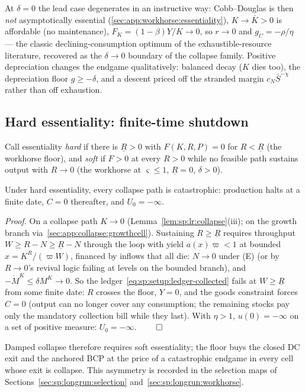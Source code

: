  At $\delta=0$ the lead case degenerates in an
instructive way: Cobb--Douglas is then \emph{not} asymptotically essential
(\ref{sec:app:workhorse:essentiality}), $K\to\bar K>0$ is affordable (no maintenance),
$F_K=\left(1-\beta\right)Y/K\to0$, so $r\to0$ and $g_C=-\rho/\eta$ --- the classic
declining-consumption optimum of the exhaustible-resource literature, recovered as the
$\delta\to0$ boundary of the collapse family. Positive depreciation changes the endgame
qualitatively: balanced decay ($K$ dies too), the depreciation floor $g\ge-\delta$, and a
descent priced off the stranded margin $c_N\bar S^{-\chi}$ rather than off exhaustion.

\subsection{Hard essentiality: finite-time shutdown}\label{sec:app:collapse:floor}

Call essentiality \emph{hard} if there is $\underline R>0$ with $F\left(K,R,P\right)=0$ for
$R<\underline R$ (the workhorse floor), and \emph{soft} if $F>0$ at every $R>0$ while no
feasible path sustains output with $R\to0$ (the workhorse at $\varsigma\le1$,
$\underline R=0$, $\delta>0$).

\begin{lemma}\label{lem:app:col:shutdown}
Under hard essentiality, every collapse path is catastrophic: production halts at a finite
date, $C=0$ thereafter, and $U_0=-\infty$.
\end{lemma}

\emph{Proof.} On a collapse path $K\to0$ (Lemma~\ref{lem:sp:lr:collapse}(iii); on the growth
branch via~\ref{sec:app:collapse:growthcell}). Sustaining $R\ge\underline R$ requires
throughput $W\ge R-N\ge\underline R-N$ through the loop with yield $a\!\left(x\right)\varpi<1$
at bounded $x=K^R/\left(\varpi W\right)$, financed by inflows that all die: $N\to0$ under (E)
(or by $R\to0$'s revival logic failing at levels on the bounded branch), and
$-\dot M^K\le\delta M^K\to0$. So the ledger~\eqref{eq:sp:setup:ledger-collected} fails at
$W\ge\underline R$ from some finite date: $R$ crosses the floor, $Y=0$, and the goods
constraint forces $C=0$ (output can no longer cover any consumption; the remaining stocks pay
only the mandatory collection bill while they last). With $\eta>1$,
$u\left(0\right)=-\infty$ on a set of positive measure: $U_0=-\infty$.
\hfill$\qed$

Damped collapse therefore requires soft essentiality; the floor buys the closed DC exit and
the anchored BCP at the price of a catastrophic endgame in every cell whose exit is collapse.
This asymmetry is recorded in the selection maps of
Sections~\ref{sec:sp:longrun:selection} and~\ref{sec:sp:longrun:workhorse}.

